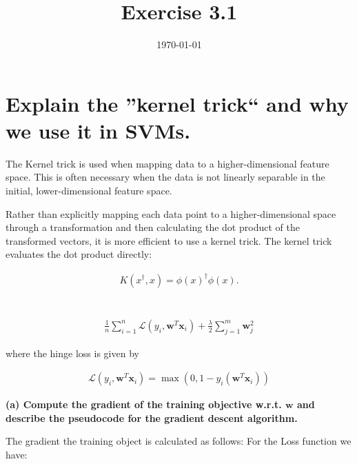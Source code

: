 \documentclass{article}
\title{Exercise 3.1}
\date{\today}
\begin{document}
\maketitle
\section{Explain the ''kernel trick`` and why we use it in SVMs.}
The Kernel trick is used when mapping data to a higher-dimensional feature space. This is often necessary when the data is not linearly separable in the initial, lower-dimensional feature space.

Rather than explicitly mapping each data point to a higher-dimensional space through a transformation and then calculating the dot product of the transformed vectors, it is more efficient to use a kernel trick. The kernel trick evaluates the dot product directly:

\begin{align}
    K(x^\dagger,x)=\phi(x)^\dagger \phi(x).
\end{align}

\section{}

\begin{align}
    \frac{1}{n} \sum_{i=1}^n \mathscr{L}\left(y_i, \boldsymbol{w}^T \boldsymbol{x}_i\right)+\frac{\lambda}{2} \sum_{j=1}^m \boldsymbol{w}_j^2
\end{align}

where the hinge loss is given by

\begin{align}
    \mathscr{L}\left(y_i, \boldsymbol{w}^T \boldsymbol{x}_i\right)=\max \left(0,1-y_i\left(\boldsymbol{w}^T \boldsymbol{x}_i\right)\right)
\end{align}

\textbf{(a) Compute the gradient of the training objective w.r.t. $\boldsymbol{w}$ and describe the pseudocode for the gradient descent algorithm.}


The gradient the training object is calculated as follows: For the Loss function we have:
\end{document}
